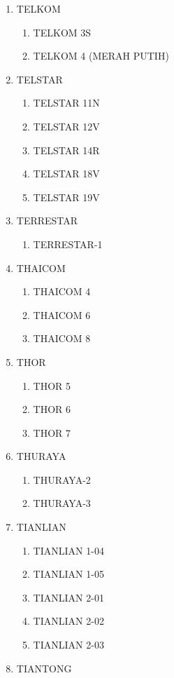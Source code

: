 \begin{multicols}{2}
\begin{enumerate}
\begin{enumerate}
  \end{enumerate}
  \item TELKOM
  \begin{enumerate}
    \item TELKOM 3S
    \item TELKOM 4 (MERAH PUTIH)
  \end{enumerate}
  \item TELSTAR
  \begin{enumerate}
    \item TELSTAR 11N
    \item TELSTAR 12V
    \item TELSTAR 14R
    \item TELSTAR 18V
    \item TELSTAR 19V
  \end{enumerate}
  \item TERRESTAR
  \begin{enumerate}
    \item TERRESTAR-1
  \end{enumerate}
  \item THAICOM
  \begin{enumerate}
    \item THAICOM 4
    \item THAICOM 6
    \item THAICOM 8
  \end{enumerate}
  \item THOR
  \begin{enumerate}
    \item THOR 5
    \item THOR 6
    \item THOR 7
  \end{enumerate}
  \item THURAYA
  \begin{enumerate}
    \item THURAYA-2
    \item THURAYA-3
  \end{enumerate}
  \item TIANLIAN
  \begin{enumerate}
    \item TIANLIAN 1-04
    \item TIANLIAN 1-05
    \item TIANLIAN 2-01
    \item TIANLIAN 2-02
    \item TIANLIAN 2-03
  \end{enumerate}
  \item TIANTONG

\end{enumerate}
\end{multicols}
